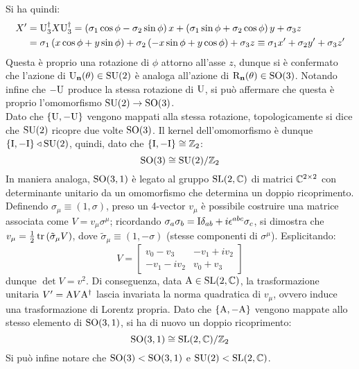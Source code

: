 Si ha quindi:
\begin{equation*}
	\begin{split}
		X'
		&= \mathrm{U}_3^{\dagger} X \mathrm{U}_3^{\dagger} = \left( \sigma_1 \cos \phi - \sigma_2 \sin \phi \right) x + \left( \sigma_1 \sin \phi + \sigma_2 \cos \phi \right) y + \sigma_3 z \\
		&= \sigma_1 \left( x \cos \phi + y \sin \phi \right) + \sigma_2 \left( -x \sin \phi + y \cos \phi \right) + \sigma_3 z \equiv \sigma_1 x' + \sigma_2 y' + \sigma_3 z'
	\end{split}
\end{equation*}
Questa è proprio una rotazione di $ \phi $ attorno all'asse $ z $, dunque si è confermato che l'azione di $ \mathrm{U}_{\mathbf{n}}(\theta) \in \mathrm{SU}(2) $ è analoga all'azione di $ \mathrm{R}_{\mathbf{n}}(\theta) \in \mathrm{SO}(3) $.
Notando infine che $ -\mathrm{U} $ produce la stessa rotazione di $ \mathrm{U} $, si può affermare che questa è proprio l'omomorfismo $ \mathrm{SU}(2) \rightarrow \mathrm{SO}(3) $.\\
Dato che $ \{\mathrm{U},-\mathrm{U}\} $ vengono mappati alla stessa rotazione, topologicamente si dice che $ \mathrm{SU}(2) $ ricopre due volte $ \mathrm{SO}(3) $. Il kernel dell'omomorfismo è dunque $ \{\mathrm{I},-\mathrm{I}\} \triangleleft \mathrm{SU}(2) $, quindi, dato che $ \{\mathrm{I},-\mathrm{I}\} \cong \mathbb{Z}_2 $:
\begin{equation}
	\mathrm{SO}(3) \cong \mathrm{SU}(2) / \mathbb{Z}_2
	\label{eq:10.20}
\end{equation}
In maniera analoga, $ \mathrm{SO}(3,1) $ è legato al gruppo $ \mathrm{SL}(2,\mathbb{C}) $ di matrici $ \mathbb{C}^{2\times2} $ con determinante unitario da un omomorfismo che determina un doppio ricoprimento. Definendo $ \sigma_{\mu} \equiv \left( 1, \sigma \right) $, preso un 4-vector $ v_{\mu} $ è possibile costruire una matrice associata come $ V = v_{\mu} \sigma^{\mu} $; ricordando $ \sigma_a \sigma_b = \mathrm{I} \delta_{ab} + i \epsilon^{abc} \sigma_c $, si dimostra che $ v_{\mu} = \frac{1}{2} \operatorname{tr} \left( \tilde{\sigma}_{\mu} V \right) $, dove $ \tilde{\sigma}_{\mu} \equiv \left( 1, -\sigma \right) $ (stesse componenti di $ \sigma^{\mu} $). Esplicitando:
\begin{equation*}
	V =
	\begin{bmatrix}
		v_0 - v_3 & -v_1 + i v_2 \\
		-v_1 - i v_2 & v_0 + v_3
	\end{bmatrix}
\end{equation*}
dunque $ \det V = v^2 $. Di conseguenza, data $ \mathrm{A} \in \mathrm{SL}(2,\mathbb{C}) $, la trasformazione unitaria $ V' = \mathrm{A} V \mathrm{A}^{\dagger} $ lascia invariata la norma quadratica di $ v_{\mu} $, ovvero induce una trasformazione di Lorentz propria. Dato che $ \{\mathrm{A},-\mathrm{A}\} $ vengono mappate allo stesso elemento di $ \mathrm{SO}(3,1) $, si ha di nuovo un doppio ricoprimento:
\begin{equation}
	\mathrm{SO}(3,1) \cong \mathrm{SL}(2,\mathbb{C}) / \mathbb{Z}_2
	\label{eq:10.21}
\end{equation}
Si può infine notare che $ \mathrm{SO}(3) < \mathrm{SO}(3,1) $ e $ \mathrm{SU}(2) < \mathrm{SL}(2,\mathbb{C}) $.

